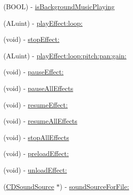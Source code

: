 \begin{DoxyCompactItemize}
(B\+O\+OL) -\/ \hyperlink{interfaceSimpleAudioEngine_a973125b75501bf21ae82f30ab1aea87c}{is\+Background\+Music\+Playing}
\item 
(A\+Luint) -\/ \hyperlink{interfaceSimpleAudioEngine_ac5a5f080f92f05ff681973c3e83c1156}{play\+Effect\+:loop\+:}
\item 
(void) -\/ \hyperlink{interfaceSimpleAudioEngine_a4d818613fe0acb6fa8dc9fac400327f0}{stop\+Effect\+:}
\item 
(A\+Luint) -\/ \hyperlink{interfaceSimpleAudioEngine_ac3e279ef9259ed8c9cb15dc1341c62e6}{play\+Effect\+:loop\+:pitch\+:pan\+:gain\+:}
\item 
(void) -\/ \hyperlink{interfaceSimpleAudioEngine_aa40807db57397fc4dba272439fa017d7}{pause\+Effect\+:}
\item 
(void) -\/ \hyperlink{interfaceSimpleAudioEngine_a50ce3f003c8028e4e2c23e36db89d362}{pause\+All\+Effects}
\item 
(void) -\/ \hyperlink{interfaceSimpleAudioEngine_a3d8cc5eee577353bfd9daa51bbee376d}{resume\+Effect\+:}
\item 
(void) -\/ \hyperlink{interfaceSimpleAudioEngine_a502d7f9edde68126ebe1ecd9d29357e4}{resume\+All\+Effects}
\item 
(void) -\/ \hyperlink{interfaceSimpleAudioEngine_a41cac6b6201c29a06ce18e52191520de}{stop\+All\+Effects}
\item 
(void) -\/ \hyperlink{interfaceSimpleAudioEngine_a0f27d03cab04292f2dcbfc1ba8344e54}{preload\+Effect\+:}
\item 
(void) -\/ \hyperlink{interfaceSimpleAudioEngine_a1f3f121b3664c6b5bcfc33c8af63e52c}{unload\+Effect\+:}
\item 
(\hyperlink{interfaceCDSoundSource}{C\+D\+Sound\+Source} $\ast$) -\/ \hyperlink{interfaceSimpleAudioEngine_a8ab8450895ef35d23744db31e5826d01}{sound\+Source\+For\+File\+:}
\end{DoxyCompactItemize}
